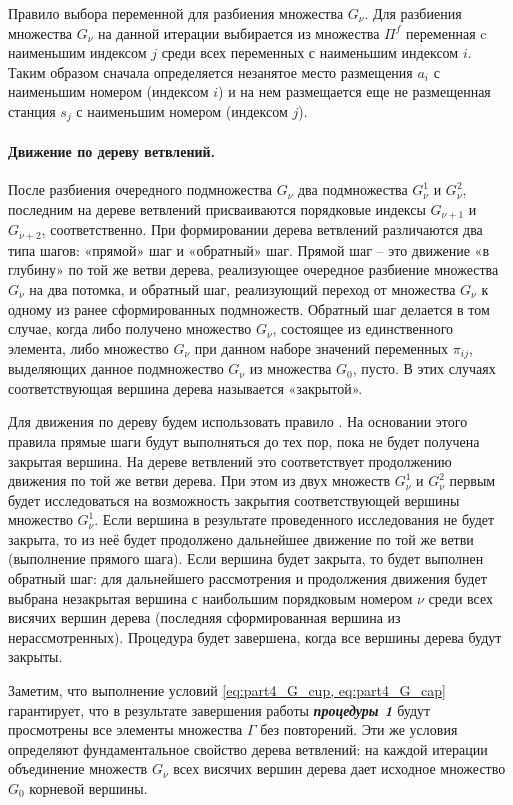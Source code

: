 Правило выбора переменной для разбиения множества $G_\nu$. Для разбиения множества $G_\nu$ на данной итерации выбирается из множества $\Pi^f$ переменная c наименьшим индексом $j$ среди всех переменных с наименьшим индексом $i$. Таким образом сначала определяется незанятое место размещения $a_i$ с наименьшим номером (индексом $i$) и на нем размещается еще не размещенная станция $s_j$ с наименьшим номером (индексом $j$).

\paragraph{Движение по дереву ветвлений.}

После разбиения очередного подмножества $G_\nu$ два подмножества $G^1_\nu$  и $G^2_\nu$, последним на дереве ветвлений присваиваются порядковые индексы $G_{\nu+1}$ и $G_{\nu+2}$, соответственно.
При формировании дерева ветвлений различаются два типа шагов: «прямой» шаг и «обратный» шаг. Прямой шаг -- это движение «в глубину» по той же ветви дерева, реализующее очередное разбиение множества $G_\nu$ на два потомка, и обратный шаг, реализующий переход от множества $G_\nu$  к одному из ранее сформированных подмножеств. Обратный шаг делается в том случае, когда либо получено множество $G_\nu$, состоящее из единственного элемента, либо множество $G_\nu$  при данном наборе значений переменных $\pi_{ij}$, выделяющих данное подмножество $G_\nu$ из множества $G_0$, пусто. В этих случаях соответствующая вершина дерева называется «закрытой».

Для движения по дереву будем использовать правило . На основании этого правила прямые шаги будут выполняться до тех пор, пока не будет получена закрытая вершина. На дереве ветвлений это соответствует продолжению движения по той же ветви дерева. При этом из двух множеств $G^1_\nu$  и $G^2_\nu$ первым будет исследоваться на возможность закрытия соответствующей вершины множество $G^1_\nu$. Если вершина в результате проведенного исследования не будет закрыта, то из неё будет продолжено дальнейшее движение по той же ветви (выполнение прямого шага). Если вершина будет закрыта, то будет выполнен обратный шаг: для дальнейшего рассмотрения и продолжения движения будет выбрана незакрытая вершина с наибольшим порядковым номером $\nu$ среди всех висячих вершин дерева (последняя сформированная вершина из нерассмотренных). Процедура будет завершена, когда все вершины дерева будут закрыты.

Заметим, что выполнение условий \cref{eq:part4_G_cup, eq:part4_G_cap} гарантирует, что в результате завершения работы \textit{\textbf{процедуры 1}} будут просмотрены все элементы множества $\Gamma$ без повторений. Эти же условия определяют фундаментальное свойство дерева ветвлений: на каждой итерации объединение множеств $G_\nu$ всех висячих вершин дерева дает исходное множество $G_0$ корневой вершины.


